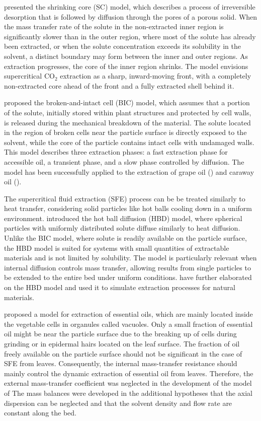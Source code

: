\documentclass[a4paper,fleqn]{cas-dc}
\begin{document}
	\citet{Goto1996} presented the shrinking core (SC) model, which describes a process of irreversible desorption that is followed by diffusion through the pores of a porous solid. When the mass transfer rate of the solute in the non-extracted inner region is significantly slower than in the outer region, where most of the solute has already been extracted, or when the solute concentration exceeds its solubility in the solvent, a distinct boundary may form between the inner and outer regions. As extraction progresses, the core of the inner region shrinks. The model envisions supercritical CO$_2$ extraction as a sharp, inward-moving front, with a completely non-extracted core ahead of the front and a fully extracted shell behind it.
	
	\citet{Sovova1994} proposed the broken-and-intact cell (BIC) model, which assumes that a portion of the solute, initially stored within plant structures and protected by cell walls, is released during the mechanical breakdown of the material. The solute located in the region of broken cells near the particle surface is directly exposed to the solvent, while the core of the particle contains intact cells with undamaged walls. This model describes three extraction phases: a fast extraction phase for accessible oil, a transient phase, and a slow phase controlled by diffusion. The model has been successfully applied to the extraction of grape oil (\citet{Sovova1994b}) and caraway oil (\citet{Sovova1994a}).
	
	The supercritical fluid extraction (SFE) process can be be treated similarly to heat transfer, considering solid particles like hot balls cooling down in a uniform environment. \citet{Bartle1990} introduced the hot ball diffusion (HBD) model, where spherical particles with uniformly distributed solute diffuse similarly to heat diffusion. Unlike the BIC model, where solute is readily available on the particle surface, the HBD model is suited for systems with small quantities of extractable materials and is not limited by solubility. The model is particularly relevant when internal diffusion controls mass transfer, allowing results from single particles to be extended to the entire bed under uniform conditions. \citet{Reverchon1993} have further elaborated on the HBD model and used it to simulate extraction processes for natural materials.
	
	\citet{Reverchon1996} proposed a model for extraction of essential oils, which are mainly located inside the vegetable cells in organules called vacuoles. Only a small fraction of essential oil might be near the particle surface due to the breaking up of cells during grinding or in epidermal hairs located on the leaf surface. The fraction of oil freely available on the particle surface should not be significant in the case of SFE from leaves. Consequently, the internal mass-transfer resistance should mainly control the dynamic extraction of essential oil from leaves. Therefore, the external mass-transfer coefficient was neglected in the development of the model of \citet{Reverchon1996} The mass balances were developed in the additional hypotheses that the axial dispersion can be neglected and that the solvent density and flow rate are constant along the bed.
	
\end{document}
